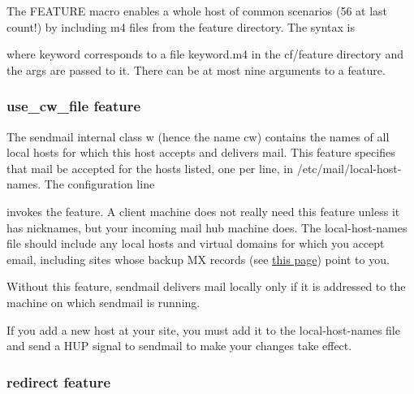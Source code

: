 The {FEATURE} macro enables a whole host of common scenarios (56 at last
count!) by including {m4} files from the {feature} directory. The syntax
is


where {keyword} corresponds to a file {keyword}{.m4} in the {cf/feature}
directory and the {args} are passed to it. There can be at most nine
arguments to a feature.

\subsubsection[
feature]{\texorpdfstring{\protect\hypertarget{part0026_split_034.htmlux5cux23_idTextAnchor1072}{}{}\protect\hypertarget{part0026_split_034.htmlux5cux23_idIndexMarker2518}{}{}{\protect\hypertarget{part0026_split_034.htmlux5cux23_idTextAnchor1073}{}{}use\_\protect\hypertarget{part0026_split_034.htmlux5cux23_idTextAnchor1074}{}{}cw\_file}
feature}{use\_cw\_file feature}}

The {sendmail} internal class {w} (hence the name {cw}) contains the
names of all local hosts for which this host accepts and delivers mail.
This feature specifies that mail be accepted for the hosts listed, one
per line, in
\protect\hypertarget{part0026_split_034.htmlux5cux23_idIndexMarker2519}{}{}{/etc/mail/local-host-names}.
The configuration line


invokes the feature. A client machine does not really need this feature
unless it has nicknames, but your incoming mail hub machine does. The
{local-host-names} file should include any local hosts and virtual
domains for which you accept email, including sites whose backup
\protect\hypertarget{part0026_split_034.htmlux5cux23_idIndexMarker2520}{}{}MX
records (see
\protect\hyperlink{part0024_split_027.htmlux5cux23_idTextAnchor882}{this
page}) point to you.

Without this feature, {sendmail} delivers mail locally only if it is
addressed to the machine on which {sendmail} is running.

If you add a new host at your site, you must add it to the
{local-host-names} file and send a HUP signal to {sendmail} to make your
changes take effect.

\subsubsection[{redirect}
feature]{\texorpdfstring{\protect\hypertarget{part0026_split_034.htmlux5cux23_idTextAnchor1075}{}{}\protect\hypertarget{part0026_split_034.htmlux5cux23_idIndexMarker2521}{}{}{redirect}
feature}{redirect feature}}

